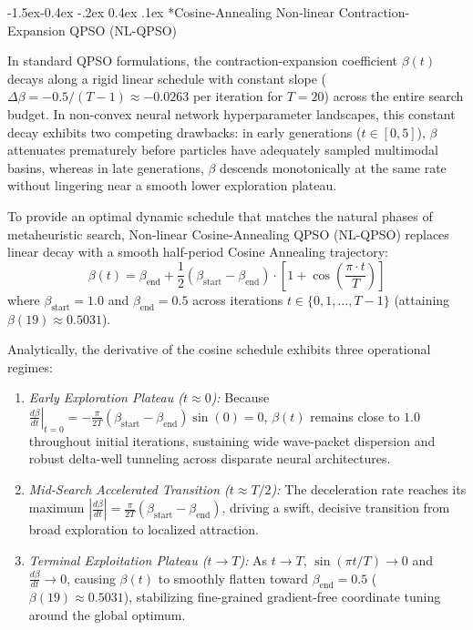 \documentclass[10pt]{article}
\makeatletter
\renewcommand\subsubsection{\@startsection{subsubsection}{3}{\z@}%
                                     {-1.5ex\@plus -0.4ex \@minus -.2ex}%
                                     {0.4ex \@plus .1ex}%
                                     {\normalfont\itshape\fontsize{7.8pt}{10.0pt}\selectfont}}
\makeatother
\begin{document}
\subsubsection*{Cosine-Annealing Non-linear Contraction-Expansion QPSO (NL-QPSO)}

In standard QPSO formulations, the contraction-expansion coefficient $\beta(t)$ decays along a rigid linear schedule with constant slope ($\Delta\beta = -0.5/(T-1) \approx -0.0263$ per iteration for $T=20$) across the entire search budget. In non-convex neural network hyperparameter landscapes, this constant decay exhibits two competing drawbacks: in early generations ($t \in [0, 5]$), $\beta$ attenuates prematurely before particles have adequately sampled multimodal basins, whereas in late generations, $\beta$ descends monotonically at the same rate without lingering near a smooth lower exploration plateau.

To provide an optimal dynamic schedule that matches the natural phases of metaheuristic search, Non-linear Cosine-Annealing QPSO (NL-QPSO) replaces linear decay with a smooth half-period Cosine Annealing trajectory:
\begin{equation}
\beta(t) = \beta_{\mathrm{end}} + \frac{1}{2}(\beta_{\mathrm{start}} - \beta_{\mathrm{end}}) \cdot \left[ 1 + \cos\left( \frac{\pi \cdot t}{T} \right) \right] \label{eq:nlqpso_beta}
\end{equation}
where $\beta_{\mathrm{start}} = 1.0$ and $\beta_{\mathrm{end}} = 0.5$ across iterations $t \in \{0, 1, \dots, T-1\}$ (attaining $\beta(19) \approx 0.5031$).

Analytically, the derivative of the cosine schedule exhibits three operational regimes:
\begin{enumerate}
    \item \textit{Early Exploration Plateau ($t \approx 0$):} Because $\left.\frac{d\beta}{dt}\right|_{t=0} = -\frac{\pi}{2T}(\beta_{\mathrm{start}} - \beta_{\mathrm{end}})\sin(0) = 0$, $\beta(t)$ remains close to $1.0$ throughout initial iterations, sustaining wide wave-packet dispersion and robust delta-well tunneling across disparate neural architectures.
    \item \textit{Mid-Search Accelerated Transition ($t \approx T/2$):} The deceleration rate reaches its maximum $\left|\frac{d\beta}{dt}\right| = \frac{\pi}{2T}(\beta_{\mathrm{start}} - \beta_{\mathrm{end}})$, driving a swift, decisive transition from broad exploration to localized attraction.
    \item \textit{Terminal Exploitation Plateau ($t \to T$):} As $t \to T$, $\sin(\pi t / T) \to 0$ and $\frac{d\beta}{dt} \to 0$, causing $\beta(t)$ to smoothly flatten toward $\beta_{\mathrm{end}} = 0.5$ ($\beta(19) \approx 0.5031$), stabilizing fine-grained gradient-free coordinate tuning around the global optimum.
\end{enumerate}
\end{document}
